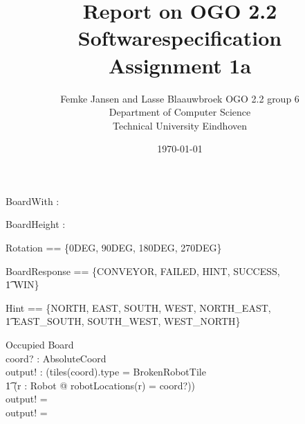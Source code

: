 \documentclass[12pt]{article}
\title{Report on OGO 2.2 Softwarespecification\\ Assignment 1a}
\author{
        Femke Jansen and Lasse Blaauwbroek OGO 2.2 group 6 \\
                Department of Computer Science\\
        Technical University Eindhoven\\
}
\date{\today}
\begin{document}
\maketitle

\begin{abstract}

\end{abstract}

\begin{axdef}
BoardWith : \nat
\end{axdef}

\begin{axdef}
BoardHeight : \nat
\end{axdef}

\begin{axdef}
Rotation == \{0DEG, 90DEG, 180DEG, 270DEG\}
\end{axdef}

\begin{axdef}
BoardResponse == \{CONVEYOR, FAILED, HINT, SUCCESS, \\ \t1 WIN\}
\end{axdef}

\begin{axdef}
Hint == \{NORTH, EAST, SOUTH, WEST, NORTH\_EAST, \\ \t1 EAST\_SOUTH, SOUTH\_WEST, WEST\_NORTH\}
\end{axdef}

\begin{schema}{Occupied}
\Xi Board \\
coord? : AbsoluteCoord \\
output! : \bool
\where
\IF (tiles(coord).type = BrokenRobotTile \; \; \vee \\ \t1
(\exists r : Robot @ robotLocations(r) = coord?)) \\
\THEN
output! = \true \\
\ELSE
output! = \false
\end{schema}
\end{document}
